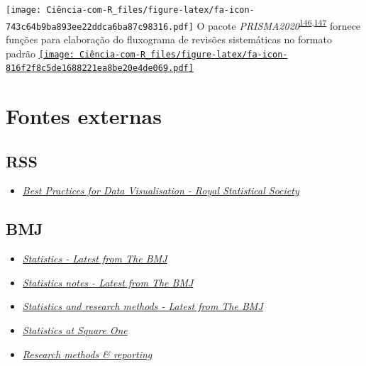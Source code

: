 \documentclass[
]{book}
\providecommand{\tightlist}{%
  \setlength{\itemsep}{0pt}\setlength{\parskip}{0pt}}
\begin{document}
\texttt{[image: Ciência-com-R\_files/figure-latex/fa-icon-743c64b9ba893ee22ddca6ba87c98316.pdf]} O pacote \emph{PRISMA2020}\textsuperscript{\protect\hyperlink{ref-PRISMA2020-2}{146},\protect\hyperlink{ref-PRISMA2020}{147}} fornece funções para elaboração do fluxograma de revisões sistemáticas no formato padrão \href{https://cran.r-project.org/web/packages/PRISMA2020/index.html}{\texttt{[image: Ciência-com-R\_files/figure-latex/fa-icon-816f2f8c5de1688221ea8be20e4de069.pdf]}}

\hypertarget{fontes-externas}{%
\chapter{\texorpdfstring{\textbf{Fontes externas}}{Fontes externas}}\label{fontes-externas}}

\hypertarget{rss}{%
\section{RSS}\label{rss}}

\begin{itemize}
\tightlist
\item
  \href{https://royal-statistical-society.github.io/datavisguide/}{\emph{Best Practices for Data Visualisation - Royal Statistical Society}}
\end{itemize}

\hypertarget{bmj}{%
\section{BMJ}\label{bmj}}

\begin{itemize}
\item
  \href{https://www.bmj.com/specialties/statistics}{\emph{Statistics - Latest from The BMJ}}
\item
  \href{https://www.bmj.com/specialties/statistics-notes}{\emph{Statistics notes - Latest from The BMJ}}
\item
  \href{https://www.bmj.com/specialties/statistics-and-research-methods}{\emph{Statistics and research methods - Latest from The BMJ}}
\item
  \href{https://www.bmj.com/about-bmj/resources-readers/publications/statistics-square-one}{\emph{Statistics at Square One}}
\item
  \href{https://www.bmj.com/research/research-methods-and-reporting}{\emph{Research methods \& reporting}}
\end{itemize}
\end{document}
